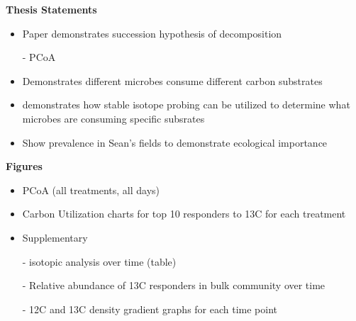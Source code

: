 \textbf{Thesis Statements}
\begin{itemize}
\item Paper demonstrates succession hypothesis of decomposition
     
     - PCoA
\item Demonstrates different microbes consume different carbon substrates
\item demonstrates how stable isotope probing can be utilized to determine what microbes are consuming specific subsrates
\item Show prevalence in Sean's fields to demonstrate ecological importance
\end{itemize}


\textbf{Figures}
\begin{itemize}
\item PCoA (all treatments, all days)
\item Carbon Utilization charts for top 10 responders to 13C for each treatment
\item Supplementary
      
      - isotopic analysis over time (table)

      - Relative abundance of 13C responders in bulk community over time

      - 12C and 13C density gradient graphs for each time point
 

\end{itemize}


